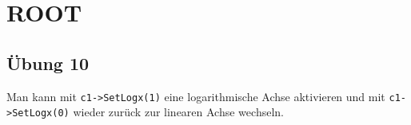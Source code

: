 
\part{ROOT}

\chapter{Übung 10}

Man kann mit \texttt{c1->SetLogx(1)} eine logarithmische Achse aktivieren und mit \texttt{c1->SetLogx(0)} wieder zurück zur linearen Achse wechseln.
